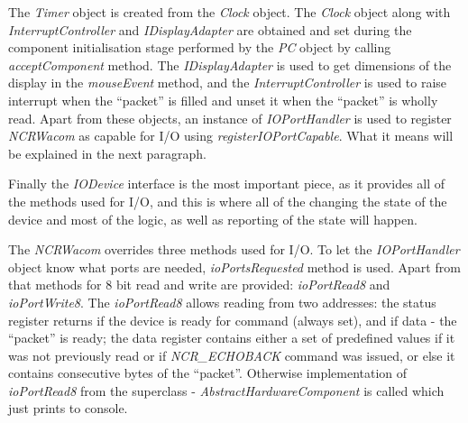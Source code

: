 The \emph{Timer} object is created from the \emph{Clock} object. The
\emph{Clock} object along with \emph{InterruptController} and
\emph{IDisplayAdapter} are obtained and set during the component initialisation
stage performed by the \emph{PC} object by calling \emph{acceptComponent}
method. The \emph{IDisplayAdapter} is used to get dimensions of the display in
the \emph{mouseEvent} method, and the \emph{InterruptController} is used to
raise interrupt when the ``packet'' is filled and unset it when the ``packet''
is wholly read. Apart from these objects, an instance of \emph{IOPortHandler} is
used to register \emph{NCRWacom} as capable for I/O using
\emph{registerIOPortCapable}. What it means will be explained in the next
paragraph.

Finally the \emph{IODevice} interface is the most important piece, as it
provides all of the methods used for I/O, and this is where all of the changing
the state of the device and most of the logic, as well as reporting of the
state will happen.

\begin{codeblock}
    
\end{codeblock}

%
%
%
%
%
%
%

The \emph{NCRWacom} overrides three methods used for I/O. To let the
\emph{IOPortHandler} object know what ports are needed, \emph{ioPortsRequested}
method is used. Apart from that methods for 8 bit read and write are provided:
\emph{ioPortRead8} and \emph{ioPortWrite8}. The \emph{ioPortRead8} allows
reading from two addresses: the status register returns if the device is ready
for command (always set), and if data - the ``packet'' is ready; the data
register contains either a set of predefined values if it was not previously
read or if \emph{NCR\_ECHOBACK} command was issued, or else it contains
consecutive bytes of the ``packet''. Otherwise implementation of
\emph{ioPortRead8} from the superclass - \emph{AbstractHardwareComponent} is
called which just prints to console.

